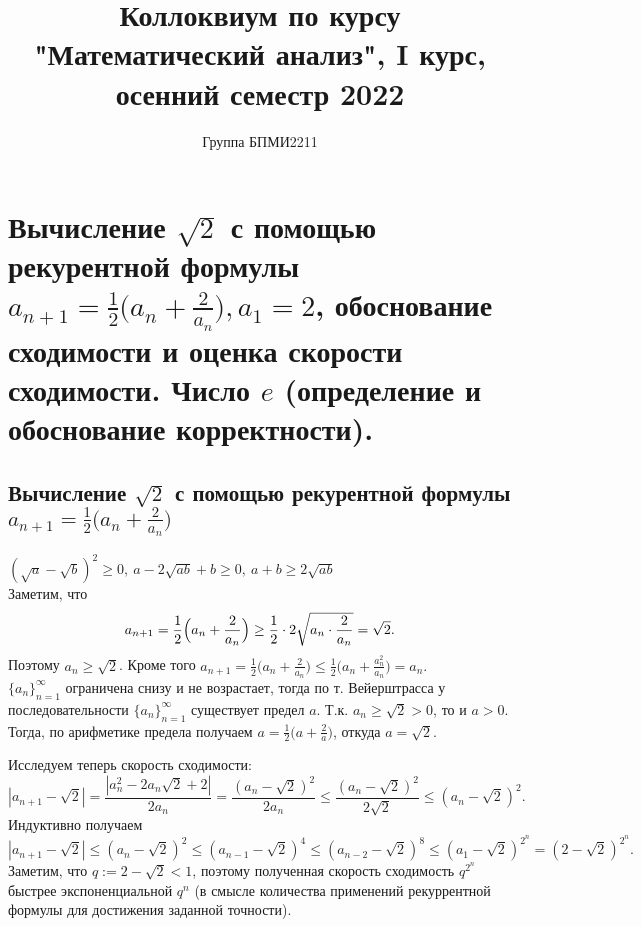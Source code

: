\documentclass[12pt]{article}
\title{Коллоквиум по курсу "Математический анализ", I курс, осенний семестр 2022}
\author{Группа БПМИ2211}
\theoremstyle{definition}
\begin{document}
\maketitle

\section{Вычисление $\sqrt{2}$ с помощью рекурентной формулы $a_{n+1}=\frac{1}{2}\bigl(a_n + \frac{2}{a_n}\bigr), a_1 = 2$, обоснование сходимости и оценка скорости сходимости. Число $e$ (определение и обоснование корректности).}
\subsection{Вычисление $\sqrt{2}$ с помощью рекурентной формулы $a_{n+1}=\frac{1}{2}\bigl(a_n + \frac{2}{a_n}\bigr)$}
{\rm 
$(\sqrt{a} - \sqrt{b})^2 \geq 0, \  a - 2\sqrt{ab} + b \geq 0, \ a + b \geq 2\sqrt{ab}$ \\ 
Заметим, что 
$$
a_{n+1}=\frac{1}{2}\Bigl(a_n + \frac{2}{a_n}\Bigr)\ge \frac{1}{2}\cdot 2\sqrt{a_n\cdot\frac{2}{a_n}}=\sqrt2.
$$
Поэтому $a_n\ge\sqrt 2$.
Кроме того
$
a_{n+1}=\frac{1}{2}\bigl(a_n + \frac{2}{a_n}\bigr) \le \frac{1}{2}\bigl(a_n + \frac{a_n^2}{a_n}\bigr)=a_n.
$ \\ 
$\{a_n\}_{n=1}^\infty$ ограничена снизу и не возрастает, тогда по т. Вейерштрасса у последовательности $\{a_n\}_{n=1}^\infty$
существует предел $a$. Т.к. $a_n\ge \sqrt2>0$, то и $a> 0$.
Тогда, по арифметике предела получаем
$a =\frac{1}{2}\bigl(a + \frac{2}{a}\bigr)$, откуда $a=\sqrt2$.

Исследуем теперь скорость сходимости:
$$
|a_{n+1} - \sqrt2| = \frac{|a_n^2 - 2 a_n\sqrt2 +2|}{2a_n}
=
\frac{(a_n - \sqrt2)^2}{2a_n}
\le
\frac{(a_n - \sqrt2)^2}{2\sqrt2}\le (a_n - \sqrt2)^2.
$$
Индуктивно получаем
$$
|a_{n+1} - \sqrt2| \le (a_n - \sqrt2)^2 \le (a_{n-1} - \sqrt2)^4
\le (a_{n-2} - \sqrt2)^8\le (a_1 - \sqrt2)^{2^{n}} = (2 - \sqrt2)^{2^{n}}.
$$
Заметим, что $q:=2-\sqrt2 <1$, поэтому полученная скорость сходимость $q^{2^n}$
быстрее экспоненциальной $q^n$
(в смысле количества применений рекуррентной формулы для достижения заданной точности).
}
\end{document}
